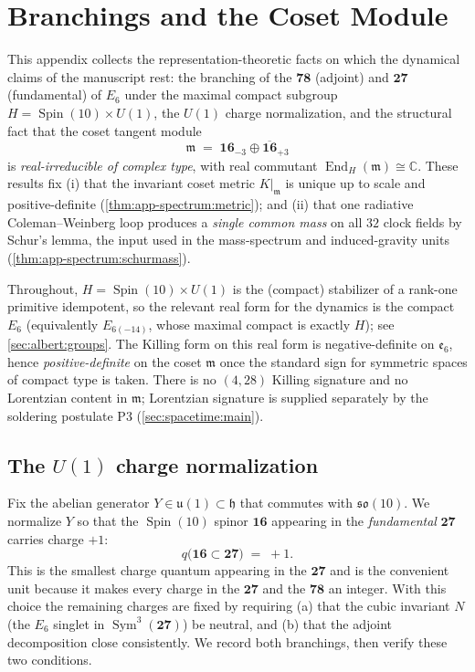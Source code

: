 \documentclass[11pt]{article}
\theoremstyle{plain}
\theoremstyle{definition}
\theoremstyle{remark}
\newcommand{\Spin}{\operatorname{Spin}}
\newcommand{\End}{\operatorname{End}}
\newcommand{\Sym}{\operatorname{Sym}}
\begin{document}
\section{Branchings and the Coset Module}
\label{sec:app-spectrum:main}

This appendix collects the representation-theoretic facts on which the
dynamical claims of the manuscript rest: the branching of the
$\mathbf{78}$ (adjoint) and $\mathbf{27}$ (fundamental) of $E_6$ under
the maximal compact subgroup $H=\Spin(10)\times U(1)$, the
$U(1)$ charge normalization, and the structural fact that the coset
tangent module
\[
  \mathfrak m \;=\; \mathbf{16}_{-3}\oplus\overline{\mathbf{16}}_{+3}
\]
is \emph{real-irreducible of complex type}, with real commutant
$\End_H(\mathfrak m)\cong\mathbb C$.  These results fix (i) that the
invariant coset metric $K|_{\mathfrak m}$ is unique up to scale and
positive-definite (\autoref{thm:app-spectrum:metric}); and (ii) that one
radiative Coleman--Weinberg loop produces a \emph{single common mass} on
all $32$ clock fields by Schur's lemma, the input used in the mass-spectrum
and induced-gravity units (\autoref{thm:app-spectrum:schurmass}).

Throughout, $H=\Spin(10)\times U(1)$ is the (compact) stabilizer of a
rank-one primitive idempotent, so the relevant real form for the dynamics
is the compact $E_6$ (equivalently $E_{6(-14)}$, whose maximal compact is
exactly $H$); see \autoref{sec:albert:groups}. The Killing form on this
real form is negative-definite on $\mathfrak e_6$, hence
\emph{positive-definite} on the coset $\mathfrak m$ once the standard
sign for symmetric spaces of compact type is taken. There is no
$(4,28)$ Killing signature and no Lorentzian content in $\mathfrak m$;
Lorentzian signature is supplied separately by the soldering postulate
P3 (\autoref{sec:spacetime:main}).

\subsection{The $U(1)$ charge normalization}
\label{sec:app-spectrum:u1}

Fix the abelian generator $Y\in\mathfrak u(1)\subset\mathfrak h$ that
commutes with $\mathfrak{so}(10)$. We normalize $Y$ so that the
$\Spin(10)$ spinor $\mathbf{16}$ appearing in the \emph{fundamental}
$\mathbf{27}$ carries charge $+1$:
\begin{equation}
  q\bigl(\mathbf{16}\subset\mathbf{27}\bigr) \;=\; +1 .
  \label{eq:app-spectrum:norm}
\end{equation}
This is the smallest charge quantum appearing in the $\mathbf{27}$ and
is the convenient unit because it makes every charge in the
$\mathbf{27}$ and the $\mathbf{78}$ an integer. With this choice the
remaining charges are fixed by requiring (a) that the cubic invariant
$N$ (the $E_6$ singlet in $\Sym^3(\mathbf{27})$) be neutral, and (b)
that the adjoint decomposition close consistently. We record both
branchings, then verify these two conditions.
\end{document}
